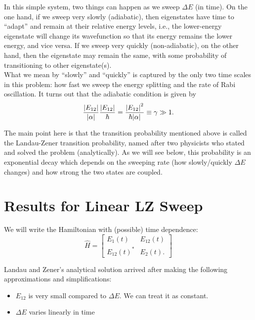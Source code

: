 \documentclass{article}
\theoremstyle{definition}
\newcommand{\al}{\alpha}
\newcommand{\f}[2]{\frac{#1}{#2}}
\begin{document}
In this simple system, two things can happen as we sweep $\Delta E$ (in time).  On the one hand, if we sweep very slowly (adiabatic), then eigenstates have time to ``adapt'' and remain at their relative energy levels, i.e., the lower-energy eigenstate will change its wavefunction so that its energy remains the lower energy, and vice versa. If we sweep very quickly (non-adiabatic), on the other hand, then the eigenstate may remain the same, with some probability of transitioning to other eigenstate(s). \\


What we mean by ``slowly'' and ``quickly'' is captured by the only two time scales in this problem: how fast we sweep the energy splitting and the rate of Rabi oscillation. It turns out that the adiabatic condition is given by 
\begin{equation*}
\f{\abs{E_{12}}}{\abs{\al}} \f{\abs{E_{12}}}{\hbar} = \f{\abs{E_{12}}^2}{\hbar\abs{\al}} \equiv \gamma \gg 1.
\end{equation*}

The main point here is that the transition probability mentioned above is called the Landau-Zener transition probability, named after two physicists who stated and solved the problem (analytically). As we will see below, this probability is an exponential decay which depends on the sweeping rate (how slowly/quickly $\Delta E$ changes) and how strong the two states are coupled. 


\section{Results for Linear LZ Sweep}

We will write the Hamiltonian with (possible) time dependence:
\begin{equation*}
\widehat{H} = \begin{bmatrix}
E_1(t) & E_{12}(t) \\ E_{12}(t)^* & E_{2}(t).
\end{bmatrix}
\end{equation*}



Landau and Zener's analytical solution arrived after making the following approximations and simplifications: 
\begin{itemize}
	\item $E_{12}$ is very small compared to $\Delta E$. We can treat it as constant.
	\item $\Delta E$ varies linearly in time 
\end{itemize}
\end{document}
